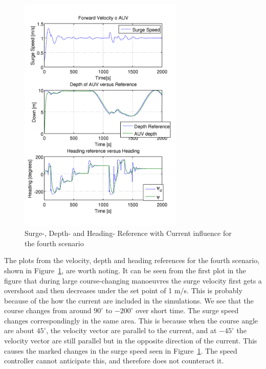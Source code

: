 		\begin{figure}[htbp]
			\centering
			\includegraphics[width=0.70\textwidth]{pics/4th_uDpsi}
			\caption[Reference plots for the 4th scenario]{Surge-, Depth- and Heading- Reference 
			with Current influence for the fourth scenario}
			\label{fig:ch3_4th_uDpsi}
		\end{figure}
		The plots from the velocity, depth and heading references for the fourth scenario, shown in
		Figure~\ref{fig:ch3_4th_uDpsi}, are worth noting. It can be seen from the first plot in the
		figure that during large course-changing manoeuvres the surge velocity first gets a overshoot
		and then decreases under the set point of 1 m/s. This is probably because of the how the
		current are included in the simulations. We see that the course changes from around $90^\circ$
		to $-200^\circ$ over short time. The surge speed changes correspondingly in the same area.
		This is because when the course angle are about $45^\circ$, the velocity vector are parallel to
		the current, and at $-45^\circ$ the velocity vector are still parallel but in the opposite
		direction of the current. This causes the marked changes in the surge speed seen in
		Figure~\ref{fig:ch3_4th_uDpsi}. The speed controller cannot anticipate this, and therefore
		does not counteract it.

